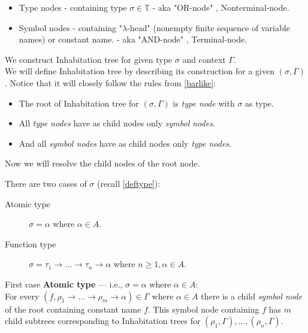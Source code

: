 \documentclass[12pt,a4paper]{report}
\begin{document}
\begin{samepage}
\begin{itemize}
  \item Type nodes   
  			- containing type $\sigma \in \mathbb{T}$ 
  			- aka "OR-node" , Nonterminal-node. 
  \item Symbol nodes 
  			- containing "$\lambda$-head" (nonempty finite sequence of variable names) or constant
  			  name. 
  			- aka "AND-node" , Terminal-node.
\end{itemize}
\end{samepage}

We construct Inhabitation tree for given type $\sigma$ and context $\Gamma$.\\
We will define Inhabitation tree by describing its construction for a given $(\sigma,\Gamma)$.
Notice that it will closely follow the rules from \ref{barlike}:

\begin{itemize}
\item The root of Inhabitation tree for $(\sigma,\Gamma)$ is 
      \textit{type node} with $\sigma$ as type.
\item All \textit{type nodes} have as child nodes only \textit{symbol nodes}. 
\item And all \textit{symbol nodes} have as child nodes only \textit{type nodes}. 
\end{itemize}

Now we will resolve the child nodes of the root node.

There are two cases of $\sigma$ (recall \ref{deftype}): 
\begin{description}
	\item[Atomic type] 
		$\sigma = \alpha $ where $\alpha \in A$. 
	\item[Function type] 
		$\sigma = \tau_1 \rightarrow \dots \rightarrow \tau_n \rightarrow \alpha$
		where $n \geq 1, \alpha \in A$.
\end{description}

First case \textbf{Atomic type} --- i.e., $\sigma = \alpha$ where $\alpha \in A$:\\
For every $(f,\rho_1 \rightarrow \dots \rightarrow \rho_m \rightarrow \alpha) \in \Gamma$
where $\alpha \in A$ there is a child \textit{symbol node} of the root containing constant name $f$.
This symbol node containing $f$ has $m$ child subtrees corresponding to Inhabitation trees for 
$(\rho_1,\Gamma),\dots,(\rho_n,\Gamma)$.   
\end{document}

